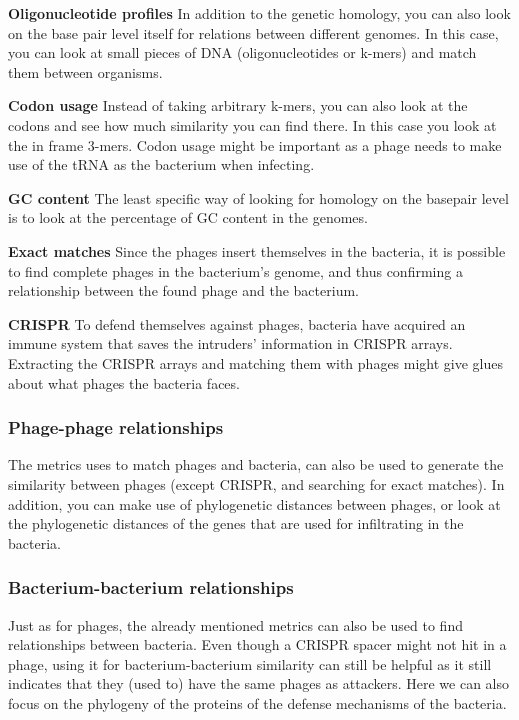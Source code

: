 \documentclass{article}
\begin{document}
\textbf{Oligonucleotide profiles} In addition to the genetic homology, you can 
also look on the base pair level itself for relations between different
genomes. In this case, you can look at small pieces of DNA (oligonucleotides or k-mers) 
and match them between organisms.

\textbf{Codon usage} Instead of taking arbitrary k-mers, you can also look 
at the codons and see how much similarity you can find there. In this case
you look at the in frame 3-mers. Codon usage might be important as a phage
needs to make use of the tRNA as the bacterium when infecting.

\textbf{GC content} The least specific way of looking for homology on the
basepair level is to look at the percentage of GC content in the genomes.

\textbf{Exact matches} Since the phages insert themselves in the bacteria, 
it is possible to find complete phages in the bacterium's genome, and thus
confirming a relationship between the found phage and the bacterium.

\textbf{CRISPR} To defend themselves against phages, bacteria have acquired
an immune system that saves the intruders' information in CRISPR arrays. 
Extracting the CRISPR arrays and matching them with phages might give
glues about what phages the bacteria faces.

\subsubsection{Phage-phage relationships}

The metrics uses to match phages and bacteria, can also be used to 
generate the similarity between phages (except CRISPR, and searching for exact matches). 
In addition, you can make use of phylogenetic distances between phages, or look
at the phylogenetic distances of the genes that are used for infiltrating in 
the bacteria.

\subsubsection{Bacterium-bacterium relationships}

Just as for phages, the already mentioned metrics can also be used to find
relationships between bacteria. Even though a CRISPR spacer might not hit
in a phage, using it for bacterium-bacterium similarity can still be helpful
as it still indicates that they (used to) have the same phages as attackers.
Here we can also focus on the phylogeny
of the proteins of the defense mechanisms of the bacteria.
\end{document}

